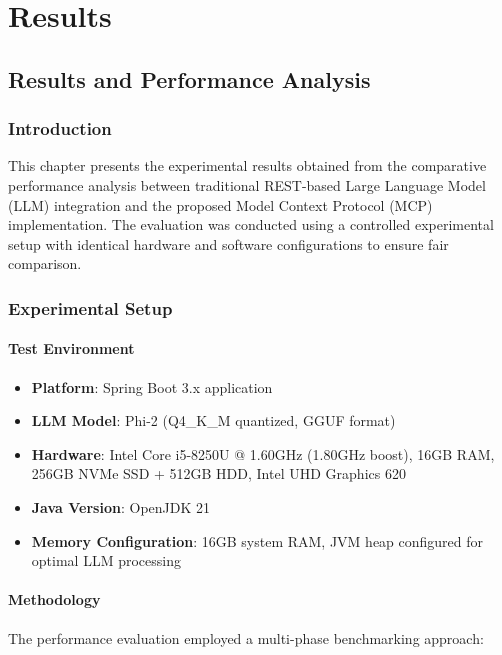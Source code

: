 \part{Results}

\chapter{Results and Performance Analysis}

\section{Introduction}

This chapter presents the experimental results obtained from the comparative performance analysis between traditional REST-based Large Language Model (LLM) integration and the proposed Model Context Protocol (MCP) implementation. The evaluation was conducted using a controlled experimental setup with identical hardware and software configurations to ensure fair comparison.

\section{Experimental Setup}

\subsection{Test Environment}

\begin{itemize}
    \item \textbf{Platform}: Spring Boot 3.x application
    \item \textbf{LLM Model}: Phi-2 (Q4\_K\_M quantized, GGUF format)
    \item \textbf{Hardware}: Intel Core i5-8250U @ 1.60GHz (1.80GHz boost), 16GB RAM, 256GB NVMe SSD + 512GB HDD, Intel UHD Graphics 620
    \item \textbf{Java Version}: OpenJDK 21
    \item \textbf{Memory Configuration}: 16GB system RAM, JVM heap configured for optimal LLM processing
\end{itemize}

\subsection{Methodology}

The performance evaluation employed a multi-phase benchmarking approach:

